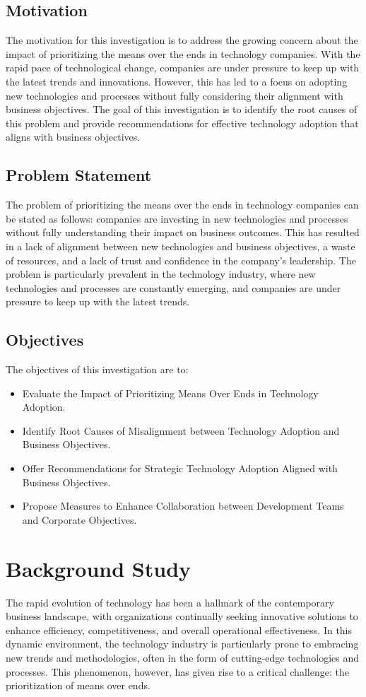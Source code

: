 \documentclass[a4Paper]{article}
\begin{document}
\subsection{Motivation}
The motivation for this investigation is to address the growing concern about the impact of prioritizing the means over the ends in technology companies. With the rapid pace of technological change, companies are under pressure to keep up with the latest trends and innovations. However, this has led to a focus on adopting new technologies and processes without fully considering their alignment with business objectives. The goal of this investigation is to identify the root causes of this problem and provide recommendations for effective technology adoption that aligns with business objectives.

\subsection{Problem Statement}
The problem of prioritizing the means over the ends in technology companies can be stated as follows: companies are investing in new technologies and processes without fully understanding their impact on business outcomes. This has resulted in a lack of alignment between new technologies and business objectives, a waste of resources, and a lack of trust and confidence in the company's leadership. The problem is particularly prevalent in the technology industry, where new technologies and processes are constantly emerging, and companies are under pressure to keep up with the latest trends.

\subsection{Objectives}
The objectives of this investigation are to:
\begin{itemize}
\item Evaluate the Impact of Prioritizing Means Over Ends in Technology Adoption.
\item Identify Root Causes of Misalignment between Technology Adoption and Business Objectives.
\item Offer Recommendations for Strategic Technology Adoption Aligned with Business Objectives.
\item Propose Measures to Enhance Collaboration between Development Teams and Corporate Objectives.
\end{itemize}
\pagebreak

\section{Background Study}
The rapid evolution of technology has been a hallmark of the contemporary business landscape, with organizations continually seeking innovative solutions to enhance efficiency, competitiveness, and overall operational effectiveness. In this dynamic environment, the technology industry is particularly prone to embracing new trends and methodologies, often in the form of cutting-edge technologies and processes. This phenomenon, however, has given rise to a critical challenge: the prioritization of means over ends.
\end{document}
